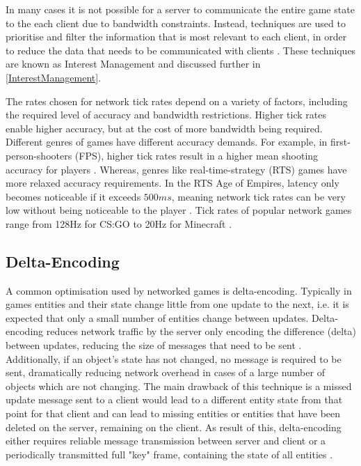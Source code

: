 In many cases it is not possible for a server to communicate the entire game state to the each client due to bandwidth constraints. Instead, techniques are used to prioritise and filter the information that is most relevant to each client, in order to reduce the data that needs to be communicated with clients \cite{pisan2004challenges}. These techniques are known as Interest Management and discussed further in \ref{InterestManagement}.

The rates chosen for network tick rates depend on a variety of factors, including the required level of accuracy and bandwidth restrictions. Higher tick rates enable higher accuracy, but at the cost of more bandwidth being required. Different genres of games have different accuracy demands. For example, in first-person-shooters (FPS), higher tick rates result in a higher mean shooting accuracy for players \cite{lee2015evaluation}. Whereas, genres like real-time-strategy (RTS) games have more relaxed accuracy requirements. In the RTS Age of Empires, latency only becomes noticeable if it exceeds $500ms$, meaning network tick rates can be very low without being noticeable to the player \cite{pisan2004challenges}. Tick rates of popular network games range from 128Hz for CS:GO to 20Hz for Minecraft \cite{metzger2016comprehensive}.

\subsection{Delta-Encoding}\label{Delta-Encoding}
A common optimisation used by networked games is delta-encoding. Typically in games entities and their state change little from one update to the next, i.e. it is expected that only a small number of entities change between updates. Delta-encoding reduces network traffic by the server only encoding the difference (delta) between updates, reducing the size of messages that need to be sent \cite{bharambe2006colyseus}. Additionally, if an object's state has not changed, no message is required to be sent, dramatically reducing network overhead in cases of a large number of objects which are not changing. The main drawback of this technique is a missed update message sent to a client would lead to a different entity state from that point for that client and can lead to missing entities or entities that have been deleted on the server, remaining on the client. As result of this, delta-encoding either requires reliable message transmission between server and client or a periodically transmitted full "key" frame, containing the state of all entities \cite{bharambe2004supporting}.

